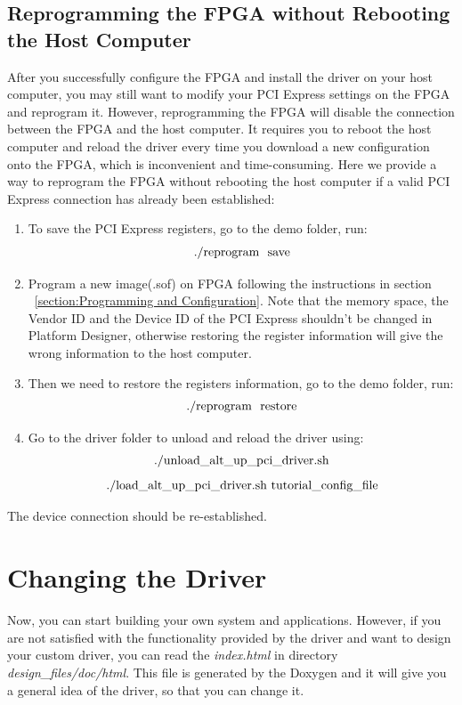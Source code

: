 \documentclass[11pt, twoside, pdftex]{article}
\newcommand{\commonPath}{../../Common}
\begin{document}
\subsection{Reprogramming the FPGA without Rebooting the Host Computer}
After you successfully configure the FPGA and install the driver on your host computer, you may still want to modify your PCI Express settings on the FPGA and reprogram it. However, reprogramming the FPGA will disable the connection between the FPGA and the host computer. It requires you to reboot the host computer and reload the driver every time you download a new configuration onto the FPGA, which is inconvenient and time-consuming. Here we provide a way to reprogram the FPGA without rebooting the host computer if a valid PCI Express connection has already been established:
\begin{enumerate}
	\item To save the PCI Express registers, go to the demo folder, run: 
		$$ {\rm ./reprogram~~save} $$
	\item Program a new image(.sof) on FPGA following the instructions in section ~\ref{section:Programming and Configuration}.
	Note that the memory space, the Vendor ID and the Device ID of the PCI Express shouldn't be changed in Platform Designer, otherwise restoring the register information will give the wrong information to the host computer.
	\item Then we need to restore the registers information, go to the demo folder, run:
		$$ {\rm ./reprogram~~restore} $$
	\item Go to the driver folder to unload and reload the driver using:
		$$ {\rm ./unload\_alt\_up\_pci\_driver.sh} $$
		$$ {\rm ./load\_alt\_up\_pci\_driver.sh\ tutorial\_config\_file} $$
\end{enumerate}
The device connection should be re-established. 

\section{Changing the Driver}
Now, you can start building your own system and applications. However, if you are not satisfied with the functionality provided by the driver and want to design your custom driver, you can read the {\it index.html} in directory {\it design\_files/doc/html}. This file is generated by the Doxygen and it will give you a general idea of the driver, so that you can change it. 





\end{document}
